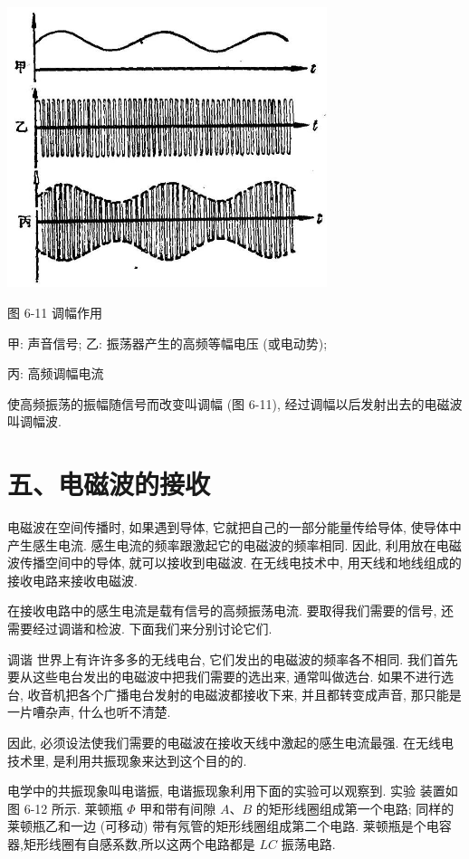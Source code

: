 \documentclass[10pt]{article}
\begin{document}
\begin{center}
\includegraphics[max width=0.7\textwidth]{images/01913056-1f15-74d8-9184-9aab52c9d66b_204_712393.jpg}
\end{center}

图 6-11 调幅作用

甲: 声音信号; 乙: 振荡器产生的高频等幅电压 (或电动势);

丙: 高频调幅电流

使高频振荡的振幅随信号而改变叫调幅 (图 6-11), 经过调幅以后发射出去的电磁波叫调幅波.

\section*{五、电磁波的接收}

电磁波在空间传播时, 如果遇到导体, 它就把自己的一部分能量传给导体, 使导体中产生感生电流. 感生电流的频率跟激起它的电磁波的频率相同. 因此, 利用放在电磁波传播空间中的导体, 就可以接收到电磁波. 在无线电技术中, 用天线和地线组成的接收电路来接收电磁波.

在接收电路中的感生电流是载有信号的高频振荡电流. 要取得我们需要的信号, 还需要经过调谐和检波. 下面我们来分别讨论它们.

调谐 世界上有许许多多的无线电台, 它们发出的电磁波的频率各不相同. 我们首先要从这些电台发出的电磁波中把我们需要的选出来, 通常叫做选台. 如果不进行选台, 收音机把各个广播电台发射的电磁波都接收下来, 并且都转变成声音, 那只能是一片嘈杂声, 什么也听不清楚.

因此, 必须设法使我们需要的电磁波在接收天线中激起的感生电流最强. 在无线电技术里, 是利用共振现象来达到这个目的的.

电学中的共振现象叫电谐振, 电谐振现象利用下面的实验可以观察到. 实验 装置如图 6-12 所示. 莱顿瓶 \(\Phi\) 甲和带有间隙 \(A\text{、}B\) 的矩形线圈组成第一个电路; 同样的莱顿瓶乙和一边 (可移动) 带有氖管的矩形线圈组成第二个电路. 莱顿瓶是个电容器,矩形线圈有自感系数,所以这两个电路都是 \({LC}\) 振荡电路.
\end{document}
